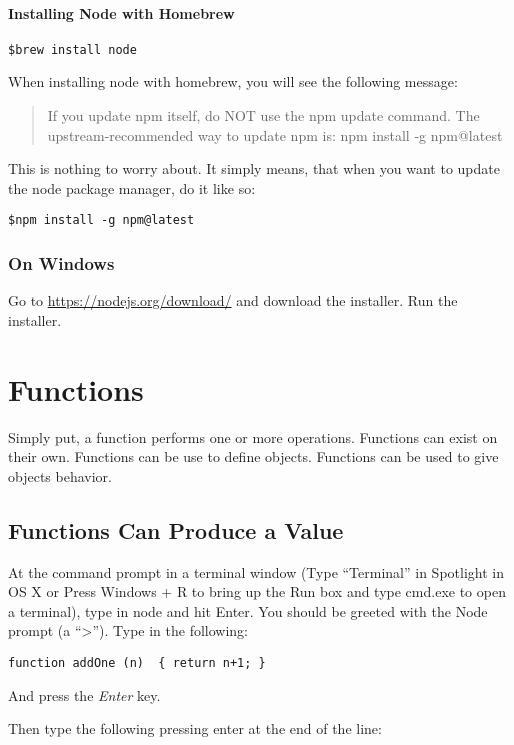 \documentclass{article}
\begin{document}
\paragraph{Installing Node with Homebrew}

\begin{lstlisting}
$brew install node
\end{lstlisting}

When installing node with homebrew, you will see the following message:
\blockquote{If you update npm itself, do NOT use the npm update command.
The upstream-recommended way to update npm is:
  npm install -g npm@latest
}

This is nothing to worry about. It simply means, that when you want to update the node package manager, do it like so:

\begin{lstlisting}
$npm install -g npm@latest
\end{lstlisting}

\subsubsection{On Windows}
Go to \url{https://nodejs.org/download/} and download the installer. Run the installer.

\section{Functions}
Simply put, a function performs one or more operations. Functions can exist on their own. Functions can be use to define objects. Functions can be used to give objects behavior.

\subsection{Functions Can Produce a Value}
At the command prompt in a terminal window (Type ``Terminal'' in Spotlight in OS X or Press Windows + R to bring up the Run box and type cmd.exe to open a terminal), type in node and hit Enter. You should be greeted with the Node prompt (a ``>''). Type in the following:

\begin{lstlisting}
function addOne (n)  { return n+1; }
\end{lstlisting}

And press the \emph{Enter} key.

Then type the following pressing enter at the end of the line:
\end{document}
